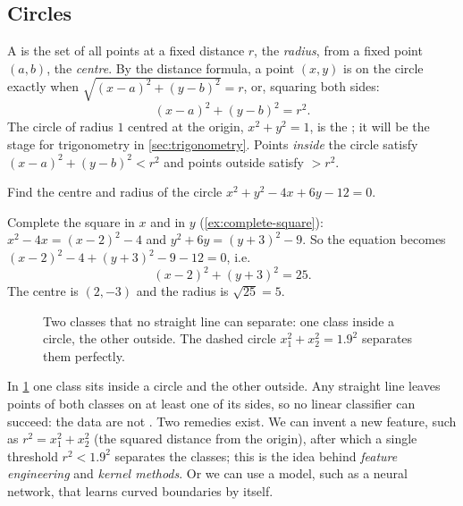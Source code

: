 \subsection{Circles}

A  is the set of all points at a fixed distance $r$, the
\emph{radius}, from a fixed point $(a, b)$, the \emph{centre}. By the distance
formula, a point $(x, y)$ is on the circle exactly when
$\sqrt{(x - a)^2 + (y - b)^2} = r$, or, squaring both sides:
\[
  (x - a)^2 + (y - b)^2 = r^2 .
\]
The circle of radius $1$ centred at the origin, $x^2 + y^2 = 1$, is the
; it will be the stage for trigonometry in
\cref{sec:trigonometry}. Points \emph{inside} the circle satisfy
$(x - a)^2 + (y - b)^2 < r^2$ and points outside satisfy $> r^2$.

\begin{example}\label{ex:circle}
Find the centre and radius of the circle $x^2 + y^2 - 4x + 6y - 12 = 0$.

\sol Complete the square in $x$ and in $y$ (\cref{ex:complete-square}):
$x^2 - 4x = (x - 2)^2 - 4$ and $y^2 + 6y = (y + 3)^2 - 9$. So the equation
becomes $(x-2)^2 - 4 + (y+3)^2 - 9 - 12 = 0$, i.e.
\[
  (x - 2)^2 + (y + 3)^2 = 25 .
\]
The centre is $(2, -3)$ and the radius is $\sqrt{25} = 5$.
\end{example}

\begin{figure}[htbp]
\centering
{}
\caption{Two classes that no straight line can separate: one class inside a
  circle, the other outside. The dashed circle $x_1^2 + x_2^2 = 1.9^2$ separates
  them perfectly.}
\label{fig:circle-classes}
\end{figure}

\begin{mlnote}
In \cref{fig:circle-classes} one class sits inside a circle and the other
outside. Any straight line leaves points of both classes on at least one of its
sides, so no linear classifier can succeed: the data are not
. Two remedies exist. We can invent a new feature,
such as $r^2 = x_1^2 + x_2^2$ (the squared distance from the origin), after
which a single threshold $r^2 < 1.9^2$ separates the classes; this is the idea
behind \emph{feature engineering} and \emph{kernel methods}. Or we can use a
model, such as a neural network, that learns curved boundaries by itself.
\end{mlnote}

